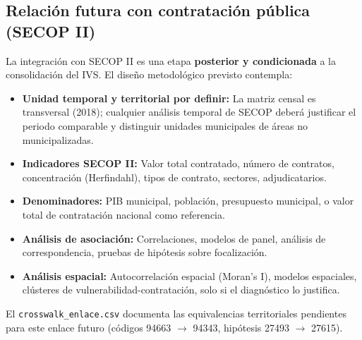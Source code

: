 \subsection{Relación futura con contratación pública (SECOP II)}
\label{sec:secop_futuro}

La integración con SECOP II es una etapa \textbf{posterior y condicionada} a la consolidación del IVS. El diseño metodológico previsto contempla:

\begin{itemize}
    \item \textbf{Unidad temporal y territorial por definir:} La matriz censal es transversal (2018); cualquier análisis temporal de SECOP deberá justificar el periodo comparable y distinguir unidades municipales de áreas no municipalizadas.
    \item \textbf{Indicadores SECOP II:} Valor total contratado, número de contratos, concentración (Herfindahl), tipos de contrato, sectores, adjudicatarios.
    \item \textbf{Denominadores:} PIB municipal, población, presupuesto municipal, o valor total de contratación nacional como referencia.
    \item \textbf{Análisis de asociación:} Correlaciones, modelos de panel, análisis de correspondencia, pruebas de hipótesis sobre focalización.
    \item \textbf{Análisis espacial:} Autocorrelación espacial (Moran's I), modelos espaciales, clústeres de vulnerabilidad-contratación, solo si el diagnóstico lo justifica.
\end{itemize}

El \texttt{crosswalk\_enlace.csv} documenta las equivalencias territoriales pendientes para este enlace futuro (códigos 94663 $\rightarrow$ 94343, hipótesis 27493 $\rightarrow$ 27615).
